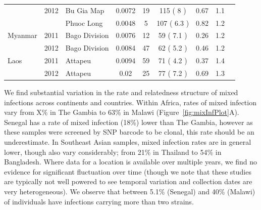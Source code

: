 \documentclass[9pt,lineno]{elife}
\begin{document}
\begin{table}[btp]
{\begin{tabular}{p{1.3cm} c p{1.8cm} c | c c c c p{2.7cm}}
         & 2012 & Bu Gia Map & 0.0072 & 19 & 115 ( 8 )& 0.67 & 1.1&\\
         &      & Phuoc Long & 0.0048 & 5 & 107 ( 6.3 )& 0.82 & 1.2&\\
\cline{1-8}
Myanmar & 2011 & Bago Division & 0.0076 & 12 & 59 ( 7.1 )& 0.26 & 1.2 &\\
        & 2012 & Bago Division & 0.0084 & 47 & 62 ( 5.2 )& 0.46 & 1.2 &\\
\cline{1-8}
Laos & 2011 & Attapeu & 0.0094 & 59 & 71 ( 4.2 )& 0.37 & 1.4 &\\
     & 2012 & Attapeu & 0.02 & 25 & 77 ( 7.2 )& 0.69 & 1.3 &\\
\hline
\hline
\end{tabular}
}

\end{table}



We find substantial variation in the rate and relatedness structure of mixed infections across continents and countries.  Within Africa, rates of mixed infection vary from X\% in The Gambia to 63\% in Malawi (Figure~\ref{fig:mixInfPlot}A). Senegal has a rate of mixed infection (18\%) lower than The Gambia, however as these samples were screened by SNP barcode to be clonal, this rate should be an underestimate.  In Southeast Asian samples, mixed infection rates are in general lower, though also vary considerably; from 21\% in Thailand to 54\% in Bangladesh.  Where data for a location is available over multiple years, we find no evidence for significant fluctuation over time (though we note that these studies are typically not well powered to see temporal variation and collection dates are very heterogeneous). We observe that between 5.1\% (Senegal) and 40\% (Malawi) of individuals have infections carrying more than two strains.
\end{document}
